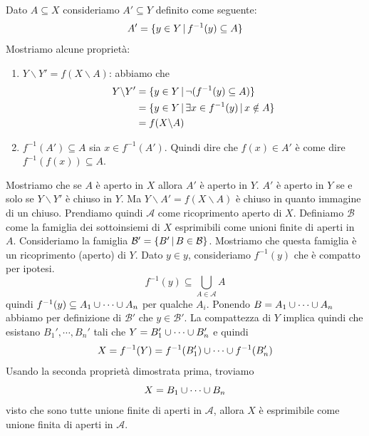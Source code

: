 \documentclass[a4paper]{article}
\begin{document}
\begin{snippetproof}{}
    Dato \(A \subseteq X\) consideriamo \(A' \subseteq Y\) definito come seguente:
    \[
        A' = \{y \in Y \,|\, f^{-1}(y) \subseteq A\}
    \]
    Mostriamo alcune proprietà:
    \begin{enumerate}
        \item \(Y \backslash Y' = f(X \backslash A)\):
        abbiamo che
        \begin{align*}
            Y \backslash Y' &= \{y \in Y \,|\, \lnot (f^{-1}(y) \subseteq A)\} \\
            &= \{y\in Y \,|\, \exists x \in f^{-1}(y) \,|\, x \notin A\} \\
            &= f(X \backslash A)
        \end{align*}
        \item \(f^{-1}(A') \subseteq A\)
        sia \(x \in f^{-1}(A')\).
        Quindi dire che \(f(x) \in A'\) è come dire
        \(f^{-1}(f(x)) \subseteq A\).
    \end{enumerate}
    Mostriamo che se \(A\) è aperto in \(X\) allora \(A'\) è aperto in \(Y\).
    \(A'\) è aperto in \(Y\) se e solo se \(Y \backslash Y'\) è chiuso in \(Y\).
    Ma \(Y \backslash A' = f(X \backslash A)\) è chiuso in quanto immagine di un chiuso.
    Prendiamo quindi \(\mathcal{A}\) come ricoprimento aperto di \(X\).
    Definiamo \(\mathcal{B}\)
    come la famiglia dei sottoinsiemi di \(X\) esprimibili come
    unioni finite di aperti in \(A\).
    Consideriamo la famiglia \(\mathcal{B}' = \{B' \,|\, B \in \mathcal{B}\}\).
    Mostriamo che questa famiglia è un ricoprimento (aperto)
    di \(Y\).
    Dato \(y\in y\), consideriamo \(f^{-1}(y)\) che è compatto per ipotesi.
    \[
        f^{-1}(y) \subseteq \bigcup_{A \in \mathcal{A}} A
    \]
    quindi
    \(f^{-1}(y) \subseteq A_1 \cup \cdots \cup A_n\) per qualche \(A_i\).
    Ponendo \(B = A_1 \cup \cdots \cup A_n\) abbiamo per definizione di \(\mathcal{B}'\)
    che \(y \in \mathcal{B}'\). La compattezza di \(Y\) implica quindi che esistano
    \(B_1', \cdots, B_n'\) tali che \(Y = B_1' \cup \cdots \cup B_n'\)
    e quindi \[
        X = f^{-1}(Y) = f^{-1}(B_1') \cup \cdots \cup f^{-1}(B_n')
    \]
    Usando la seconda proprietà dimostrata prima, troviamo
    \[
        X = B_1 \cup \cdots \cup B_n
    \]
    visto che sono tutte unione finite di aperti in \(\mathcal{A}\),
    allora \(X\) è esprimibile come unione finita di aperti in \(\mathcal{A}\).
\end{snippetproof}
\end{document}
